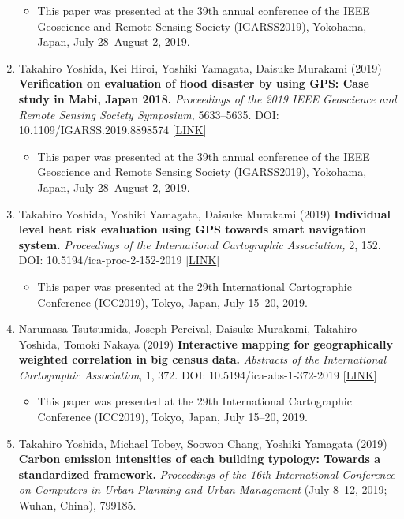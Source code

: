 \documentclass[]{book}
\providecommand{\tightlist}{%
  \setlength{\itemsep}{0pt}\setlength{\parskip}{0pt}}
\begin{document}
\begin{enumerate}
  \begin{itemize}
  \tightlist
  \item
    This paper was presented at the 39th annual conference of the IEEE Geoscience and Remote Sensing Society (IGARSS2019), Yokohama, Japan, July 28--August 2, 2019.
  \end{itemize}
\item
  Takahiro Yoshida, Kei Hiroi, Yoshiki Yamagata, Daisuke Murakami (2019)
  \textbf{Verification on evaluation of flood disaster by using GPS: Case study in Mabi, Japan 2018.}
  \emph{Proceedings of the 2019 IEEE Geoscience and Remote Sensing Society Symposium,} 5633--5635.
  DOI: 10.1109/IGARSS.2019.8898574 {[}\href{https://ieeexplore.ieee.org/document/8898574}{LINK}{]}

  \begin{itemize}
  \tightlist
  \item
    This paper was presented at the 39th annual conference of the IEEE Geoscience and Remote Sensing Society (IGARSS2019), Yokohama, Japan, July 28--August 2, 2019.
  \end{itemize}
\item
  Takahiro Yoshida, Yoshiki Yamagata, Daisuke Murakami (2019)
  \textbf{Individual level heat risk evaluation using GPS towards smart navigation system.}
  \emph{Proceedings of the International Cartographic Association,} 2, 152.
  DOI: 10.5194/ica-proc-2-152-2019 {[}\href{https://www.proc-int-cartogr-assoc.net/2/152/2019/}{LINK}{]}

  \begin{itemize}
  \tightlist
  \item
    This paper was presented at the 29th International Cartographic Conference (ICC2019), Tokyo, Japan, July 15--20, 2019.
  \end{itemize}
\item
  Narumasa Tsutsumida, Joseph Percival, Daisuke Murakami, Takahiro Yoshida, Tomoki Nakaya (2019)
  \textbf{Interactive mapping for geographically weighted correlation in big census data.}
  \emph{Abstracts of the International Cartographic Association}, 1, 372.
  DOI: 10.5194/ica-abs-1-372-2019 {[}\href{https://www.abstr-int-cartogr-assoc.net/1/372/2019/}{LINK}{]}

  \begin{itemize}
  \tightlist
  \item
    This paper was presented at the 29th International Cartographic Conference (ICC2019), Tokyo, Japan, July 15--20, 2019.
  \end{itemize}
\item
  Takahiro Yoshida, Michael Tobey, Soowon Chang, Yoshiki Yamagata (2019)
  \textbf{Carbon emission intensities of each building typology: Towards a standardized framework.}
  \emph{Proceedings of the 16th International Conference on Computers in Urban Planning and Urban Management} (July 8--12, 2019; Wuhan, China), 799185.


\end{enumerate}
\end{document}
